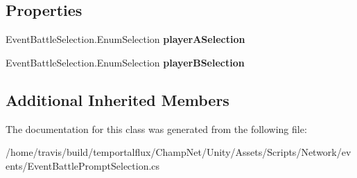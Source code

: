 \subsection*{Properties}
\begin{DoxyCompactItemize}
\item 
\hypertarget{class_event_battle_prompt_selection_aa9ca6487ac2ac31cf01f3d9b8472e734}{Event\-Battle\-Selection.\-Enum\-Selection {\bfseries player\-A\-Selection}}\label{class_event_battle_prompt_selection_aa9ca6487ac2ac31cf01f3d9b8472e734}

\item 
\hypertarget{class_event_battle_prompt_selection_ac9d4e41da558dfb57634ea3e6f4b1db9}{Event\-Battle\-Selection.\-Enum\-Selection {\bfseries player\-B\-Selection}}\label{class_event_battle_prompt_selection_ac9d4e41da558dfb57634ea3e6f4b1db9}

\end{DoxyCompactItemize}
\subsection*{Additional Inherited Members}


The documentation for this class was generated from the following file\-:\begin{DoxyCompactItemize}
\item 
/home/travis/build/temportalflux/\-Champ\-Net/\-Unity/\-Assets/\-Scripts/\-Network/events/Event\-Battle\-Prompt\-Selection.\-cs\end{DoxyCompactItemize}
